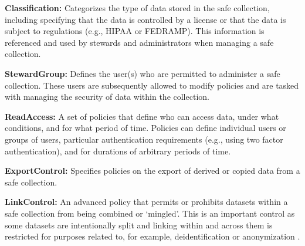 \textbf{Classification:} Categorizes the type of data stored in the
safe collection, including specifying that the data is controlled by
a license or that the data is subject to regulations (e.g., HIPAA or FEDRAMP).
This information is referenced and used by stewards and administrators when
managing a safe collection.

\textbf{StewardGroup:} Defines the user(s) who are permitted to
administer a safe collection. These users are subsequently
allowed to modify policies and are tasked with managing the
security of data within the collection.

\textbf{ReadAccess:} A set of policies that define who can
access data, under what conditions, and for what period of time.
Policies can define individual users or groups of users, particular
authentication requirements (e.g., using two factor authentication),
and for durations of arbitrary periods of time.

\textbf{ExportControl:} Specifies policies on the export of derived or copied data
from a safe collection.

\textbf{LinkControl:} An advanced policy that permits
or prohibits datasets within a safe collection from being
combined or `mingled'. This is an important control as some datasets
are intentionally split and linking within and across them is restricted for purposes related to, for example, deidentification or anonymization .



